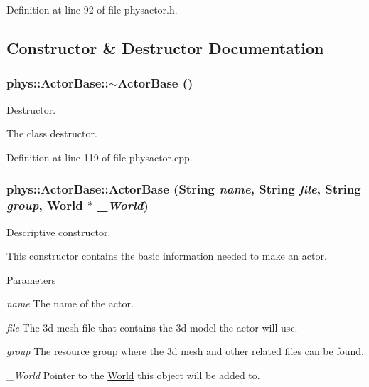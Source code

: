 Definition at line 92 of file physactor.h.



\subsection{Constructor \& Destructor Documentation}
\hypertarget{classphys_1_1ActorBase_a5e5d4b50c83c6851e554b5e7ad65403f}{
\subsubsection[{$\sim$ActorBase}]{\setlength{\rightskip}{0pt plus 5cm}phys::ActorBase::$\sim$ActorBase ()}}
\label{d8/d0f/classphys_1_1ActorBase_a5e5d4b50c83c6851e554b5e7ad65403f}


Destructor. 

The class destructor. 

Definition at line 119 of file physactor.cpp.

\hypertarget{classphys_1_1ActorBase_ad9d90a68921ce81653e9950c1330809d}{
\subsubsection[{ActorBase}]{\setlength{\rightskip}{0pt plus 5cm}phys::ActorBase::ActorBase ({\bf String} {\em name}, \/  {\bf String} {\em file}, \/  {\bf String} {\em group}, \/  {\bf World} $\ast$ {\em \_\-World})}}
\label{d8/d0f/classphys_1_1ActorBase_ad9d90a68921ce81653e9950c1330809d}


Descriptive constructor. 

This constructor contains the basic information needed to make an actor. 
\begin{DoxyParams}{Parameters}
\item[{\em name}]The name of the actor. \item[{\em file}]The 3d mesh file that contains the 3d model the actor will use. \item[{\em group}]The resource group where the 3d mesh and other related files can be found. \item[{\em \_\-World}]Pointer to the \hyperlink{classphys_1_1World}{World} this object will be added to. \end{DoxyParams}


